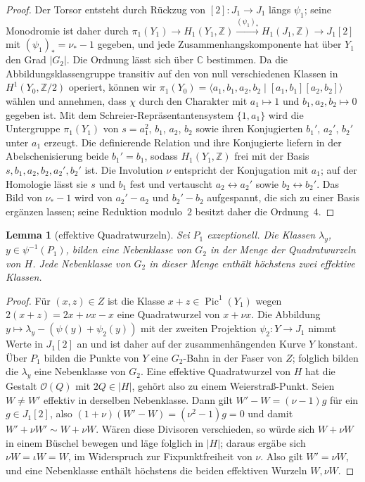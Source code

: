 \documentclass[11pt]{article}
\newtheorem{lemma}[theorem]{Lemma}
\theoremstyle{definition}
\theoremstyle{remark}
\DeclareMathOperator{\Pic}{Pic}
\newcommand{\OO}{\mathcal{O}}
\begin{document}
\begin{proof}
Der Torsor entsteht durch Rückzug von $[2]\colon J_1\to J_1$ längs $\psi_1$;
seine Monodromie ist daher durch
$\pi_1(Y_1)\to H_1(Y_1,\mathbb{Z})\xrightarrow{(\psi_1)_*}
H_1(J_1,\mathbb{Z})\to J_1[2]$ mit $(\psi_1)_*=\nu_*-1$ gegeben, und jede
Zusammenhangskomponente hat über $Y_1$ den Grad $|G_2|$. Die Ordnung lässt sich
über $\mathbb{C}$ bestimmen. Da die Abbildungsklassengruppe transitiv auf den von
null verschiedenen Klassen in $H^1(Y_0,\mathbb{Z}/2)$ operiert, können wir
$\pi_1(Y_0)=\langle a_1,b_1,a_2,b_2\mid[a_1,b_1][a_2,b_2]\rangle$ wählen und
annehmen, dass $\chi$ durch den Charakter mit $a_1\mapsto 1$ und
$b_1,a_2,b_2\mapsto 0$ gegeben ist. Mit dem Schreier-Repräsentantensystem
$\{1,a_1\}$ wird die Untergruppe $\pi_1(Y_1)$ von $s=a_1^2$, $b_1$, $a_2$, $b_2$
sowie ihren Konjugierten $b_1'$, $a_2'$, $b_2'$ unter $a_1$ erzeugt. Die
definierende Relation und ihre Konjugierte liefern in der Abelschenisierung beide
$b_1'=b_1$, sodass $H_1(Y_1,\mathbb{Z})$ frei mit der Basis
$s,b_1,a_2,b_2,a_2',b_2'$ ist. Die Involution $\nu$ entspricht der Konjugation
mit $a_1$; auf der Homologie lässt sie $s$ und $b_1$ fest und vertauscht
$a_2\leftrightarrow a_2'$ sowie $b_2\leftrightarrow b_2'$. Das Bild von $\nu_*-1$
wird von $a_2'-a_2$ und $b_2'-b_2$ aufgespannt, die sich zu einer Basis ergänzen
lassen; seine Reduktion modulo~$2$ besitzt daher die Ordnung~$4$.
\end{proof}

\begin{lemma}[effektive Quadratwurzeln]\label{lem:keff}
Sei $P_1$ exzeptionell. Die Klassen $\lambda_y$, $y\in\psi^{-1}(P_1)$, bilden
eine Nebenklasse von $G_2$ in der Menge der Quadratwurzeln von $H$. Jede
Nebenklasse von $G_2$ in dieser Menge enthält höchstens zwei effektive Klassen.
\end{lemma}

\begin{proof}
Für $(x,z)\in Z$ ist die Klasse $x+z\in\Pic^1(Y_1)$ wegen $2(x+z)=2x+\nu x-x$
eine Quadratwurzel von $x+\nu x$. Die Abbildung
$y\mapsto\lambda_y-(\psi(y)+\psi_2(y))$ mit der zweiten Projektion
$\psi_2\colon Y\to J_1$ nimmt Werte in $J_1[2]$ an und ist daher auf der
zusammenhängenden Kurve $Y$ konstant. Über $P_1$ bilden die Punkte von $Y$ eine
$G_2$-Bahn in der Faser von $Z$; folglich bilden die $\lambda_y$ eine Nebenklasse
von $G_2$. Eine effektive Quadratwurzel von $H$ hat die Gestalt $\OO(Q)$ mit
$2Q\in|H|$, gehört also zu einem Weierstraß-Punkt. Seien $W\ne W'$ effektiv in
derselben Nebenklasse. Dann gilt $W'-W=(\nu-1)g$ für ein $g\in J_1[2]$, also
$(1+\nu)(W'-W)=(\nu^2-1)g=0$ und damit $W'+\nu W'\sim W+\nu W$. Wären diese
Divisoren verschieden, so würde sich $W+\nu W$ in einem Büschel bewegen und läge
folglich in $|H|$; daraus ergäbe sich $\nu W=\iota W=W$, im Widerspruch zur
Fixpunktfreiheit von $\nu$. Also gilt $W'=\nu W$, und eine Nebenklasse enthält
höchstens die beiden effektiven Wurzeln $W,\nu W$.
\end{proof}
\end{document}

